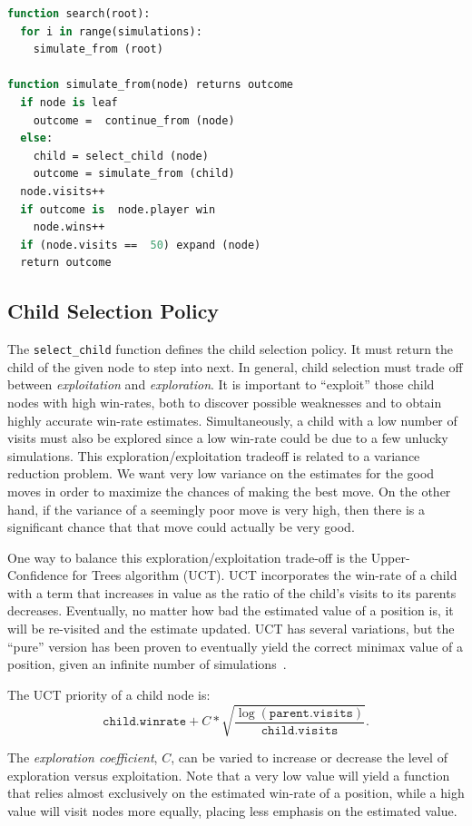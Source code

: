 \documentclass{acm_proc_article-sp}
\begin{document}
\begin{lstlisting}[float,frame=single,language=Pascal,caption=MCTS Algorithm Pseudocode]
function search(root):
  for i in range(simulations):
    simulate_from (root)

function simulate_from(node) returns outcome
  if node is leaf
    outcome =  continue_from (node)
  else:
    child = select_child (node)
    outcome = simulate_from (child)
  node.visits++
  if outcome is  node.player win
    node.wins++
  if (node.visits ==  50) expand (node)
  return outcome
\end{lstlisting}

\subsection{Child Selection Policy}
The \verb+select_child+ function defines the child selection policy. It must return the child of the given node to step into next. 
In general, child selection must trade off between \emph{exploitation} and \emph{exploration}. 
It is important to ``exploit'' those child nodes with high win-rates, both
to discover possible weaknesses and to obtain highly accurate win-rate estimates. 
Simultaneously, a child with a low number of visits must also be explored since a low win-rate
could be due to a few unlucky simulations.
This exploration/exploitation tradeoff is related to a variance reduction problem.  
We want very low variance on the estimates for the good moves in order to maximize the chances of making the best move.
On the other hand, if the variance of a seemingly poor move is very high, then there is a significant chance that that move could actually be very good.

One way to balance this exploration/exploitation trade-off is the Upper-Confidence for Trees algorithm (UCT). 
UCT incorporates the win-rate of a child with a term that increases in value as the ratio of the child's visits to its parents decreases. 
Eventually, no matter how bad the estimated value of a position is, it will be re-visited and the estimate updated. 
UCT has several variations, but the ``pure'' version has been proven to eventually yield the correct minimax value of a position, given an infinite number of simulations~\cite{gelly2006exploration}.

The UCT priority of a child node is:
\[
	\texttt{child.winrate} + C*\sqrt{\frac{\log{(\texttt{parent.visits})}}{\texttt{child.visits}}}.
\]

The \emph{exploration coefficient}, $C$, can be varied to increase or decrease the level of exploration versus exploitation. Note that a very low value will yield a function that relies almost exclusively on the estimated win-rate of a position, while a high value will visit nodes more equally, placing less emphasis on the estimated value.
\end{document}
